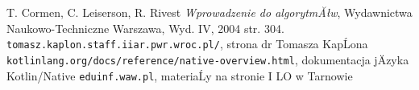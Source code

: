 \documentclass[a4paper, 11pt]{article}
\begin{document}
	\newpage
	
	\newpage
	\begin{thebibliography}{99}
		 T. Cormen, C. Leiserson, R. Rivest \emph{Wprowadzenie do algorytmĂłw}, Wydawnictwa Naukowo-Techniczne Warszawa, Wyd. IV, 2004
		 \cite{cormen} str.  304.
		 \texttt{tomasz.kaplon.staff.iiar.pwr.wroc.pl/}, strona dr Tomasza KapĹona
		 \texttt{kotlinlang.org/docs/reference/native-overview.html}, dokumentacja jÄzyka Kotlin/Native
		 \texttt{eduinf.waw.pl}, materiaĹy na stronie I LO w Tarnowie
		
		
	\end{thebibliography}
	
\end{document}
